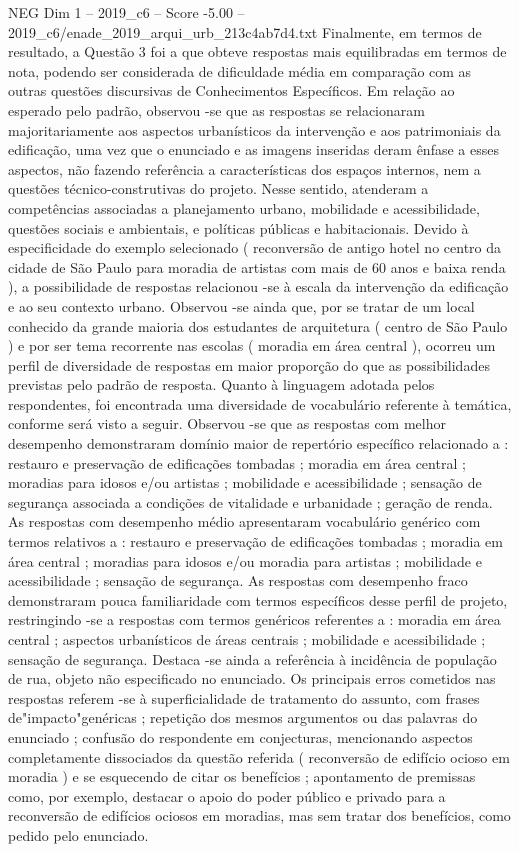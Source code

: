 \begin{textsample}{NEG Dim 1 – 2019\_c6 – Score -5.00 – 2019\_c6/enade\_2019\_arqui\_urb\_213c4ab7d4.txt}
Finalmente, em termos de resultado, a Questão 3 foi a que obteve respostas mais equilibradas em termos de nota, podendo ser considerada de dificuldade média em comparação com as outras questões discursivas de Conhecimentos Específicos.
Em relação ao esperado pelo padrão, observou -se que as respostas se relacionaram majoritariamente aos aspectos urbanísticos da intervenção e aos patrimoniais da edificação, uma vez que o enunciado e as imagens inseridas deram ênfase a esses aspectos, não fazendo referência a características dos espaços internos, nem a questões técnico-construtivas do projeto.
Nesse sentido, atenderam a competências associadas a planejamento urbano, mobilidade e acessibilidade, questões sociais e ambientais, e políticas públicas e habitacionais.
Devido à especificidade do exemplo selecionado ( reconversão de antigo hotel no centro da cidade de São Paulo para moradia de artistas com mais de 60 anos e baixa renda ), a possibilidade de respostas relacionou -se à escala da intervenção da edificação e ao seu contexto urbano.
Observou -se ainda que, por se tratar de um local conhecido da grande maioria dos estudantes de arquitetura ( centro de São Paulo ) e por ser tema recorrente nas escolas ( moradia em área central ), ocorreu um perfil de diversidade de respostas em maior proporção do que as possibilidades previstas pelo padrão de resposta.
Quanto à linguagem adotada pelos respondentes, foi encontrada uma diversidade de vocabulário referente à temática, conforme será visto a seguir.
Observou -se que as respostas com melhor desempenho demonstraram domínio maior de repertório específico relacionado a : restauro e preservação de edificações tombadas ; moradia em área central ; moradias para idosos e/ou artistas ; mobilidade e acessibilidade ; sensação de segurança associada a condições de vitalidade e urbanidade ; geração de renda.
As respostas com desempenho médio apresentaram vocabulário genérico com termos relativos a : restauro e preservação de edificações tombadas ; moradia em área central ; moradias para idosos e/ou moradia para artistas ; mobilidade e acessibilidade ; sensação de segurança.
As respostas com desempenho fraco demonstraram pouca familiaridade com termos específicos desse perfil de projeto, restringindo -se a respostas com termos genéricos referentes a : moradia em área central ; aspectos urbanísticos de áreas centrais ; mobilidade e acessibilidade ; sensação de segurança.
Destaca -se ainda a referência à incidência de população de rua, objeto não especificado no enunciado.
Os principais erros cometidos nas respostas referem -se à superficialidade de tratamento do assunto, com frases de"impacto"genéricas ; repetição dos mesmos argumentos ou das palavras do enunciado ; confusão do respondente em conjecturas, mencionando aspectos completamente dissociados da questão referida ( reconversão de edifício ocioso em moradia ) e se esquecendo de citar os benefícios ; apontamento de premissas como, por exemplo, destacar o apoio do poder público e privado para a reconversão de edifícios ociosos em moradias, mas sem tratar dos benefícios, como pedido pelo enunciado.

\end{textsample}
